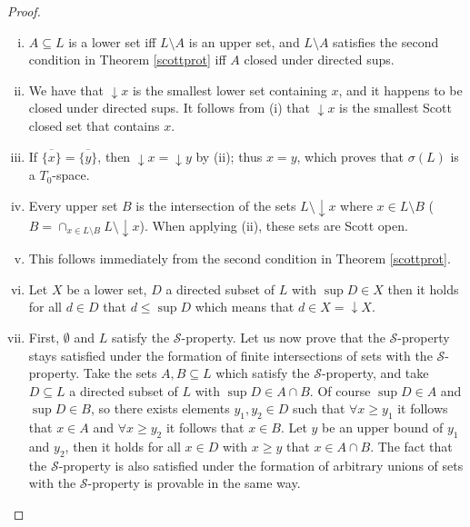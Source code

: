 \documentclass[a4paper,12pt]{article}
\begin{document}
\begin{proof}
\begin{enumerate}[(i)]
    \item $A \subseteq L$ is a lower set iff $L \setminus A$ is an upper set, and $L \setminus A$ satisfies the second condition in Theorem \ref{scottprot} iff $A$ closed under directed sups.
    \item We have that $\downarrow x$ is the smallest lower set containing $x$, and it happens to be closed under directed sups. It follows from (i) that $\downarrow x$ is the smallest Scott closed set that contains $x$.
    \item If $\overline{\{x\}} = \overline{\{y\}}$, then $\downarrow x = \downarrow y$ by (ii); thus $x = y$, which proves that $\sigma(L)$ is a $T_0$-space.
    \item Every upper set $B$ is the intersection of the sets $L \setminus \downarrow x$ where $x \in L \setminus B$ ($B = \cap_{x \in L \setminus B} L \setminus \downarrow x$). When applying (ii), these sets are Scott open.
    \item This follows immediately from the second condition in Theorem \ref{scottprot}.
    \item Let $X$ be a lower set, $D$ a directed subset of $L$ with $\sup D \in X$ then it holds for all $d \in D$ that $d \leq \sup D$ which means that $d \in X = \downarrow X$.
    \item First, $\emptyset$ and $L$ satisfy the $\mathcal{S}$-property. Let us now prove that the $\mathcal{S}$-property stays satisfied under the formation of finite intersections of sets with the $\mathcal{S}$-property. Take the sets $A, B \subseteq L$ which satisfy the $\mathcal{S}$-property, and take $D \subseteq L$ a directed subset of $L$ with $\sup D \in A \cap B$. Of course $\sup D \in A$ and $\sup D \in B$, so there exists elements $y_1, y_2 \in D$ such that $\forall x \geq y_1$ it follows that $x \in A$ and $\forall x \geq y_2$ it follows that $x \in B$. Let $y$ be an upper bound of $y_1$ and $y_2$, then it holds for all $x \in D$ with $x \geq y$ that $x \in A \cap B$. The fact that the $\mathcal{S}$-property is also satisfied under the formation of arbitrary unions of sets with the $\mathcal{S}$-property is provable in the same way.
\end{enumerate}
\end{proof}
\end{document}
